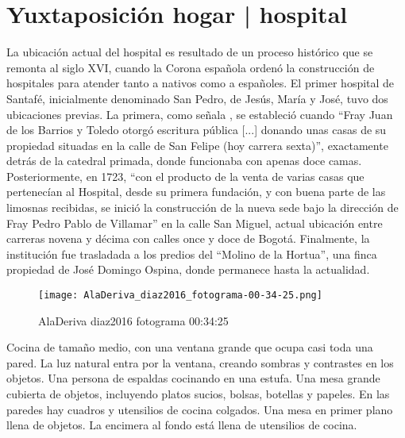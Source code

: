 


\clearpage

\section{Yuxtaposición hogar | hospital}

La ubicación actual del hospital es resultado de un proceso histórico que se remonta al siglo XVI, cuando la Corona española ordenó la construcción de hospitales para atender tanto a nativos como a españoles. El primer hospital de Santafé, inicialmente denominado San Pedro, de Jesús, María y José, tuvo dos ubicaciones previas. La primera, como señala \parencite{Romero1994}, se estableció cuando \enquote{Fray Juan de los Barrios y Toledo otorgó escritura pública [...] donando unas casas de su propiedad situadas en la calle de San Felipe (hoy carrera sexta)}, exactamente detrás de la catedral primada, donde funcionaba con apenas doce camas. Posteriormente, en 1723, \enquote{con el producto de la venta de varias casas que pertenecían al Hospital, desde su primera fundación, y con buena parte de las limosnas recibidas, se inició la construcción de la nueva sede bajo la dirección de Fray Pedro Pablo de Villamar} en la calle San Miguel, actual ubicación entre carreras novena y décima con calles once y doce de Bogotá. Finalmente, la institución fue trasladada a los predios del \enquote{Molino de la Hortua}, una finca propiedad de José Domingo Ospina, donde permanece hasta la actualidad.


\clearpage
\begin{figure}[h!]
    \centering
    \texttt{[image: AlaDeriva\_diaz2016\_fotograma-00-34-25.png]}
    \caption{AlaDeriva diaz2016 fotograma 00:34:25}
    \label{fig:AlaDeriva_diaz2016_fotograma_00_34_25}
\end{figure}

Cocina de tamaño medio, con una ventana grande que ocupa casi toda una pared. La luz natural entra por la ventana, creando sombras y contrastes en los objetos. Una persona de espaldas cocinando en una estufa. Una mesa grande cubierta de objetos, incluyendo platos sucios, bolsas, botellas y papeles. En las paredes hay cuadros y utensilios de cocina colgados. Una mesa en primer plano llena de objetos. La encimera al fondo está llena de utensilios de cocina. \parencite[fotograma: 00:34:25]{AlaDeriva_diaz2016}

